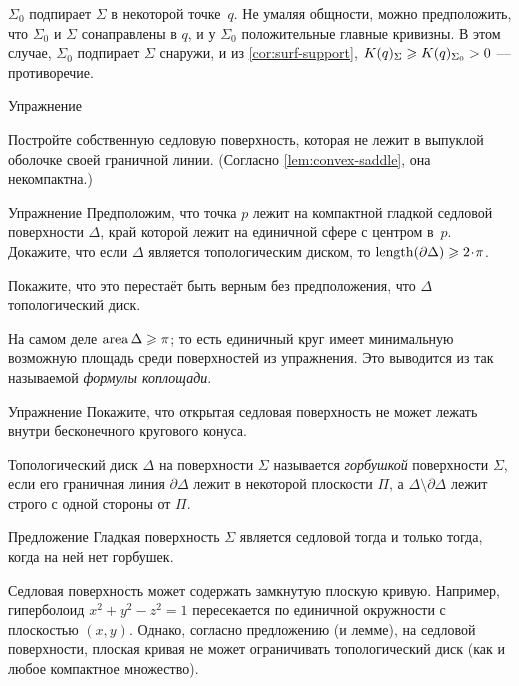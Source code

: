 $\Sigma_0$ подпирает $\Sigma$ в некоторой точке~$q$.
Не умаляя общности, можно предположить, что $\Sigma_0$ и $\Sigma$ сонаправлены в $q$, и у $\Sigma_0$ положительные главные кривизны.
В этом случае, $\Sigma_0$ подпирает $\Sigma$ снаружи,
и из \ref{cor:surf-support}, $K(q)_\Sigma\z\ge K(q)_{\Sigma_0}>0$ --- противоречие.
\qeds


\begin{thm}{Упражнение}\label{ex:proper-saddle}
{\sloppy 
Постройте собственную седловую поверхность, которая не лежит в выпуклой оболочке своей граничной линии.
(Согласно \ref{lem:convex-saddle}, она некомпактна.)

}
\end{thm}

\begin{thm}{Упражнение}\label{ex:length-of-bry}
Предположим, что точка $p$ лежит на компактной гладкой седловой поверхности $\Delta$, край которой лежит на единичной сфере с центром в~$p$.
Докажите, что если $\Delta$ является топологическим диском, то $\length(\partial\Delta)\ge 2\cdot\pi$.

Покажите, что это перестаёт быть верным без предположения, что $\Delta$ топологический диск.
\end{thm}

На самом деле $\mathop{\rm area}\nolimits \Delta\geqslant \pi$;
то есть единичный круг имеет минимальную возможную площадь среди поверхностей из упражнения.
Это выводится из так называемой \emph{формулы коплощади}.

\begin{thm}{Упражнение}\label{ex:circular-cone-saddle}
Покажите, что открытая седловая поверхность
не может лежать внутри бесконечного кругового конуса. 
\end{thm}

Топологический диск $\Delta$ на поверхности $\Sigma$ называется \emph{горбушкой} поверхности $\Sigma$, если его граничная линия $\partial\Delta$ лежит в некоторой плоскости $\Pi$, а $\Delta \setminus \partial \Delta$ лежит строго с одной стороны от $\Pi$.

\begin{thm}{Предложение}\label{prop:hat}
Гладкая поверхность $\Sigma$ является седловой тогда и только тогда, когда на ней нет горбушек.
\end{thm}

Седловая поверхность может содержать замкнутую плоскую кривую.
Например, гиперболоид $x^2+y^2-z^2=1$ пересекается по единичной окружности с плоскостью $(x,y)$.
Однако, согласно предложению (и лемме), на седловой поверхности, плоская кривая не может ограничивать топологический диск (как и любое компактное множество).


